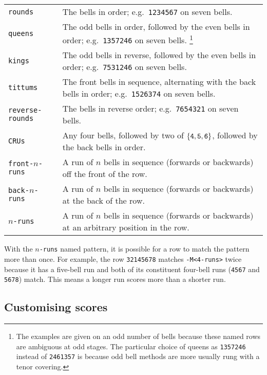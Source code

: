 \documentclass[a4paper,11pt,oneside]{book}
\begin{document}
\begin{tabularx}{\textwidth}{lX}
\texttt{rounds}\index{rounds}
  &The bells in order; e.g.\ \texttt{1234567} on seven bells.\\
\texttt{queens}\index{queens}
  &The odd bells in order, followed by the even bells in order;
  e.g.\ \texttt{1357246} on seven bells.%
  \footnote{The examples are given on an odd number of bells because these
  named rows are ambiguous at odd stages.  The particular choice of queens
  as \texttt{1357246} instead of \texttt{2461357} is because odd bell methods
  are more usually rung with a tenor covering.}\\
\texttt{kings}\index{kings}
  &The odd bells in reverse, followed by the even bells in order;
  e.g.\ \texttt{7531246} on seven bells.\\
\texttt{tittums}\index{tittums}
  &The front bells in sequence, alternating with the back bells
  in order; e.g.\ \texttt{1526374} on seven bells.\\
\texttt{reverse-rounds}\index{reverse rounds}&
  The bells in reverse order; e.g.\ \texttt{7654321} on 
  seven bells.\\
\texttt{CRUs}\index{combination roll-up}&
  Any four bells, followed by two of $\{ \hbox{\tt4}, \hbox{\tt5}, 
  \hbox{\tt6}\}$, followed by the back bells in order.\\
\texttt{front-}$n$\texttt{-runs}\index{runs}&
  A run of $n$ bells in sequence 
  (forwards or backwards) off the front of the row.\\
\texttt{back-}$n$\texttt{-runs}&A run of $n$ bells in sequence
  (forwards or backwards) at the back of the row.\\
$n$\texttt{-runs}&A run of $n$ bells in sequence (forwards or backwards) at
  an arbitrary position in the row.\\
\end{tabularx}

With the $n$\verb+-runs+ named pattern, it is possible for a row to match
the pattern more than once.  For example, the row \verb+32145678+ matches
\verb+-M<4-runs>+ twice because it has a five-bell run and both of its 
constituent four-bell runs (\verb+4567+ and \verb+5678+) match.  This means
a longer run scores more than a shorter run.

\subsection{Customising scores}\label{musscore}
\end{document}
